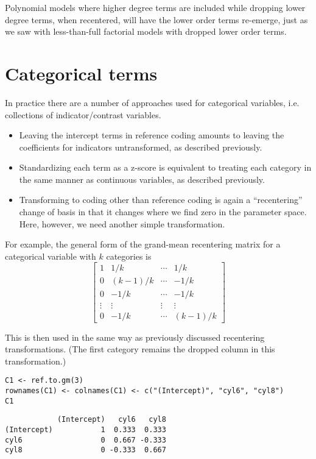 \documentclass[]{article}
\providecommand{\tightlist}{%
  \setlength{\itemsep}{0pt}\setlength{\parskip}{0pt}}
\begin{document}
Polynomial models where higher degree terms are included while dropping
lower degree terms, when recentered, will have the lower order terms
re-emerge, just as we saw with less-than-full factorial models with
dropped lower order terms.

\section{Categorical terms}\label{categorical-terms}

In practice there are a number of approaches used for categorical
variables, i.e. collections of indicator/contrast variables.

\begin{itemize}
\tightlist
\item
  Leaving the intercept terms in reference coding amounts to leaving the
  coefficients for indicators untransformed, as described previously.
\item
  Standardizing each term as a z-score is equivalent to treating each
  category in the same manner as continuous variables, as described
  previously.
\item
  Transforming to coding other than reference coding is again a
  ``recentering'' change of basis in that it changes where we find zero
  in the parameter space. Here, however, we need another simple
  transformation.
\end{itemize}

For example, the general form of the grand-mean recentering matrix for a
categorical variable with \(k\) categories is \[
\begin{bmatrix}
1 &1/k     &\cdots &1/k \\
0 &(k-1)/k &\cdots &-1/k \\
0 &-1/k    &\cdots &-1/k \\
\vdots &\vdots &\vdots &\vdots \\
0 &-1/k    &\cdots &(k-1)/k
\end{bmatrix}
\]

This is then used in the same way as previously discussed recentering
transformations. (The first category remains the dropped column in this
transformation.)

\begin{verbatim}
C1 <- ref.to.gm(3)
rownames(C1) <- colnames(C1) <- c("(Intercept)", "cyl6", "cyl8")
C1
\end{verbatim}

\begin{verbatim}
            (Intercept)   cyl6   cyl8
(Intercept)           1  0.333  0.333
cyl6                  0  0.667 -0.333
cyl8                  0 -0.333  0.667
\end{verbatim}
\end{document}
